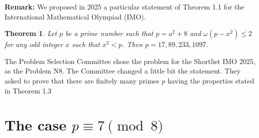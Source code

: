 \documentclass[12pt]{article}
\newtheorem{theorem}[definition]{Theorem}
{\theorembodyfont{\rmfamily}\newtheorem{example}[definition]{Example}}
{\theorembodyfont{\rmfamily}\newtheorem{examples}[definition]{Examples}}
{\theorembodyfont{\rmfamily}\newtheorem{observation}[definition]{Observation}}
\begin{document}
{{\bf Remark:} We proposed in 2025 a particular statement of Theorem 1.1 for the International Mathematical Olympiad (IMO).

\begin{theorem}
Let $p$ be a prime number such that $p=a^2+8$ and $\omega (p-x^2)\leq 2$ for any odd integer $x$ such that $x^2<p$. Then $p=17,89,233,1097$.
\end{theorem}

The Problem Selection Committee chose the problem for the Shortlist IMO 2025, as the Problem N8. The Committee changed a little bit the statement. They asked to prove that there are finitely many primes $p$ having the properties stated in Theorem 1.3
\section{The case $p\equiv 7 \pmod 8$}

}
\end{document}
